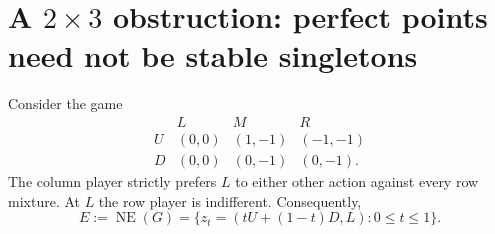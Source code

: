 \documentclass[11pt]{article}
\newcommand{\NE}{\operatorname{NE}}
\theoremstyle{definition}
\theoremstyle{remark}
\begin{document}
\section{\texorpdfstring{A $2\times3$ obstruction: perfect points need not be stable singletons}{A 2 by 3 obstruction: perfect points need not be stable singletons}}
Consider the game
\begin{equation}\label{eq:2by3game}
\begin{array}{c|ccc}
 &L&M&R\\\hline
 U&(0,0)&(1,-1)&(-1,-1)\\
 D&(0,0)&(0,-1)&(0,-1).
\end{array}
\end{equation}
The column player strictly prefers $L$ to either other action against every
row mixture. At $L$ the row player is indifferent. Consequently,
\begin{equation}\label{eq:segment}
 E:=\NE(G)=\{z_t=(tU+(1-t)D,L):0\le t\le1\}.
\end{equation}
\end{document}
